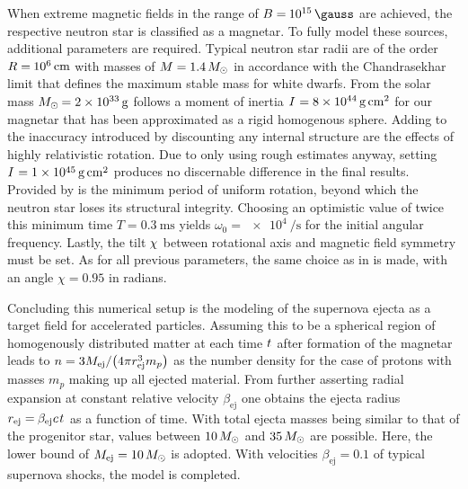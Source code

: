 When extreme magnetic fields in the range of $B = \kern-0.5pt \qty{e15}{\gauss}$ are achieved, the respective neutron star is
classified as a magnetar. To fully model these sources, additional parameters are required. Typical neutron star radii are of the
order $R = \kern-0.5pt \qty{e6}{\centi\meter}$ with masses of $M = \num{1.4} \kern+1.5pt M_\odot$ in accordance with the Chandrasekhar
limit that defines the maximum stable mass for white dwarfs. From the solar mass $M_\odot \kern-0.75pt = \qty{2e33}{\gram}$ follows
a moment of inertia $I \kern+0.5pt = \qty{8e44}{\gram\centi\meter\squared}$ for our magnetar that has been approximated as a rigid
homogenous sphere. Adding to the inaccuracy introduced by discounting any internal structure are the effects of highly relativistic
rotation. Due to only using rough estimates anyway, setting $\cramped{I \kern+0.5pt = \qty{1e45}{\gram\centi\meter\squared}}$ produces no
discernable difference in the final results. Provided by \cite{Haensel_1999} is the minimum period of uniform rotation, beyond
which the neutron star loses its structural integrity. Choosing an optimistic value of twice this minimum time $T = \qty{0.3}{\milli\second}$
yields $\omega_0 = \qty{e4}{\per\second}$ for the initial angular frequency. Lastly, the tilt $\kern-0.5pt \chi \kern+0.5pt$
between rotational axis and magnetic field symmetry must be set. As for all previous parameters, the same choice as in
\cite{Carpio_2020} is made, with an angle $\chi = \num{0.95}$ in radians.

\enlargethispage{\baselineskip}

Concluding this numerical setup is the modeling of the supernova ejecta as a target field for accelerated particles. Assuming
this to be a spherical region of homogenously distributed matter at each time $t \kern+0.5pt$ after formation of the magnetar
leads to $\cramped{n = 3 M_\text{ej} / \bigl( 4\pi r_\text{ej}^3 m_p \bigr)} \kern+0.5pt$ as the number density for the case of
protons with masses $m_p$ making up all ejected material. From further asserting radial expansion at constant relative velocity
$\beta_\text{ej}$ one obtains the ejecta radius $r_\text{ej} = \kern-0.4pt \beta_\text{ej} \kern+0.1pt c \kern+1.0pt t \kern+0.5pt$
as a function of time. With total ejecta masses being similar to that of the progenitor star, values between $\num{10} \kern+1.5pt M_\odot$
and $\num{35} \kern+1.5pt M_\odot$ are possible. Here, the lower bound of $\cramped{M_\text{ej} = \num{10} \kern+1.5pt M_\odot}$ is adopted.
With velocities $\beta_\text{ej} = \num{0.1}$ of typical supernova shocks, the model is completed.


